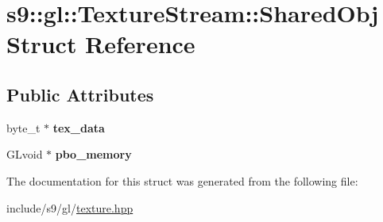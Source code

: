 \hypertarget{structs9_1_1gl_1_1TextureStream_1_1SharedObj}{\section{s9\-:\-:gl\-:\-:Texture\-Stream\-:\-:Shared\-Obj Struct Reference}
\label{structs9_1_1gl_1_1TextureStream_1_1SharedObj}
}
\subsection*{Public Attributes}
\begin{DoxyCompactItemize}
\item 
\hypertarget{structs9_1_1gl_1_1TextureStream_1_1SharedObj_aa9821dd241dc81f893e44313d414d721}{byte\-\_\-t $\ast$ {\bfseries tex\-\_\-data}}\label{structs9_1_1gl_1_1TextureStream_1_1SharedObj_aa9821dd241dc81f893e44313d414d721}

\item 
\hypertarget{structs9_1_1gl_1_1TextureStream_1_1SharedObj_a02e0b37aa3bd21f35c91a3141b5593ae}{G\-Lvoid $\ast$ {\bfseries pbo\-\_\-memory}}\label{structs9_1_1gl_1_1TextureStream_1_1SharedObj_a02e0b37aa3bd21f35c91a3141b5593ae}

\end{DoxyCompactItemize}


The documentation for this struct was generated from the following file\-:\begin{DoxyCompactItemize}
\item 
include/s9/gl/\hyperlink{texture_8hpp}{texture.\-hpp}\end{DoxyCompactItemize}
